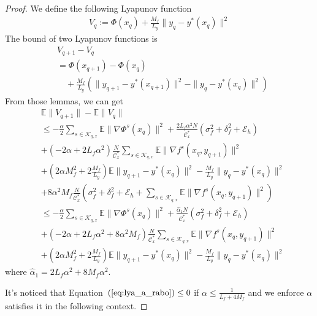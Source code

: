 \documentclass[lettersize,journal]{IEEEtran}
\begin{document}
\begin{proof}
We define the following Lyapunov function
\begin{align*}
    V_q:=\Phi(x_q)+\frac{M_f}{L_y}\|y_q-y^*(x_q)\|^2
\end{align*}
The bound of two Lyapunov functions is  
\begin{align*}
&V_{q+1}-V_{q}\\&=\Phi(x_{q+1})-\Phi(x_q)\\&\quad+\frac{M_f}{L_y}\left( \|y_{q+1}-y^*(x_{q+1})\|^2-\|y_q-y^*(x_q)\|^2\right)
\end{align*}  
From those lemmas, we can get  
\begin{subequations}
\begin{align}
    &\mathbb{E}\| V_{q+1}\|-\mathbb{E}\|V_{q} \|\nonumber\\&\leq-\frac{\alpha}{2}\sum_{s\in \mathcal{K}_{q,x}}\mathbb{E}\|\nabla \Phi^s(x_{q})\|^2+\frac{2L_f\alpha^2 N}{\mathcal{C}_x^*}(\sigma_f^2+\delta^2_f+\mathcal{E}_h)\nonumber\\
    &+(-2\alpha+2 L_f\alpha^2)\frac{N}{\mathcal{C}_x^*}\sum_{s\in \mathcal{K}_{q,x}}\mathbb{E}\|\nabla f^s(x_{q},y_{q+1})\|^2\nonumber\\
    &+(2\alpha M_f^2+2\frac{M_f}{L_y})\mathbb{E}\|y_{q+1}-y^*(x_q)\|^2-\frac{M_f}{L_y}\|y_q-y^*(x_q)\|^2\nonumber\\
    &+8\alpha^2M_f\frac{N}{\mathcal{C}_x^*}(\sigma_f^2+\delta^2_f+\mathcal{E}_h+\sum_{s\in \mathcal{K}_{q,x}}\mathbb{E}\|\nabla f^s(x_{q},y_{q+1})\|^2)\nonumber\\
    &\leq -\frac{\alpha}{2}\sum_{s\in \mathcal{K}_{q,x}}\mathbb{E}\|\nabla \Phi^s(x_{q})\|^2+\frac{\hat{\alpha}_1 N}{\mathcal{C}_x^*}(\sigma_f^2+\delta^2_f+\mathcal{E}_h)\nonumber\\
    &+(-2\alpha+2 L_f\alpha^2+8\alpha^2M_f)\frac{N}{\mathcal{C}_x^*}\sum_{s\in \mathcal{K}_{q,x}}\mathbb{E}\|\nabla f^s(x_{q},y_{q+1})\|^2\label{eq:lya_a_rabo}\\
    &+(2\alpha M_f^2+2\frac{M_f}{L_y})\mathbb{E}\|y_{q+1}-y^*(x_q)\|^2-\frac{M_f}{L_y}\|y_q-y^*(x_q)\|^2\label{eq:lya_b_rabo}
\end{align}
\end{subequations}
where $\hat{\alpha}_1=2L_f\alpha^2+8M_f\alpha^2$.

It's noticed that Equation~$(\ref{eq:lya_a_rabo})\leq 0$ if $\alpha\leq\frac{1}{L_f+4M_f}$ and we enforce $\alpha$ satisfies it in the following context.


\end{proof}
\end{document}
